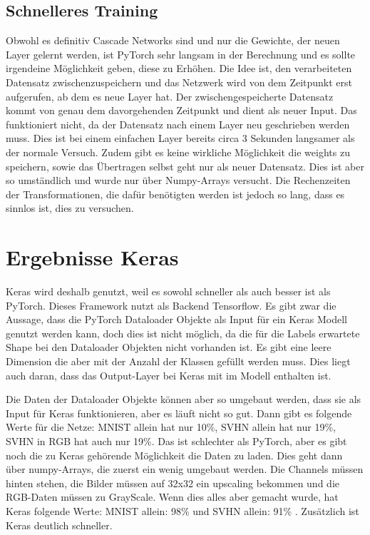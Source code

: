 \subsection{Schnelleres Training}
    Obwohl es definitiv Cascade Networks sind und nur die Gewichte, der neuen Layer gelernt 
    werden, ist PyTorch sehr langsam in der Berechnung und es sollte irgendeine Möglichkeit 
    geben, diese zu Erhöhen.
    Die Idee ist, den verarbeiteten Datensatz zwischenzuspeichern und das Netzwerk wird von dem Zeitpunkt 
    erst aufgerufen, ab dem es neue Layer hat. Der zwischengespeicherte Datensatz kommt 
    von genau dem davorgehenden Zeitpunkt und dient als neuer Input. Das funktioniert nicht, 
    da der Datensatz nach einem Layer neu geschrieben werden muss. Dies ist bei einem 
    einfachen Layer bereits circa 3 Sekunden langsamer als der normale Versuch. Zudem gibt 
    es keine wirkliche Möglichkeit die weights zu speichern, sowie das Übertragen selbst 
    geht nur als neuer Datensatz. Dies ist aber so umständlich und wurde nur über Numpy-Arrays versucht. 
    Die Rechenzeiten der Transformationen, die dafür benötigten werden ist jedoch so lang, dass es 
    sinnlos ist, dies zu versuchen.


\section{Ergebnisse Keras}
    Keras wird deshalb genutzt, weil es sowohl schneller als auch besser ist als PyTorch. 
    Dieses Framework nutzt als Backend Tensorflow.
    Es gibt zwar die Aussage, dass die PyTorch Dataloader Objekte als Input für ein 
    Keras Modell genutzt werden kann, doch dies ist nicht möglich, da die für die Labels 
    erwartete Shape bei den Dataloader Objekten nicht vorhanden ist. Es gibt eine leere 
    Dimension die aber mit der Anzahl der Klassen gefüllt werden muss. 
    Dies liegt auch daran, dass das Output-Layer bei Keras mit im Modell enthalten ist. 

    Die Daten der Dataloader Objekte können aber so umgebaut werden, dass sie als Input 
    für Keras funktionieren, aber es läuft nicht so gut. Dann gibt es folgende Werte für die Netze: 
    MNIST allein hat nur 10\%, SVHN allein hat nur 19\%, SVHN in RGB hat auch nur 19\%. 
    Das ist schlechter als PyTorch, aber es gibt noch die zu Keras gehörende Möglichkeit die 
    Daten zu laden. Dies geht dann über numpy-Arrays, die zuerst ein wenig umgebaut werden. 
    Die Channels müssen hinten stehen, die Bilder müssen auf 32x32 ein upscaling bekommen und 
    die RGB-Daten müssen zu GrayScale. Wenn dies alles aber gemacht wurde, hat Keras folgende Werte: 
    MNIST allein: 98\% \cite{MNIST_Network} und SVHN allein: 91\% \cite{SVHN_Network}. 
    Zusätzlich ist Keras deutlich schneller. 
